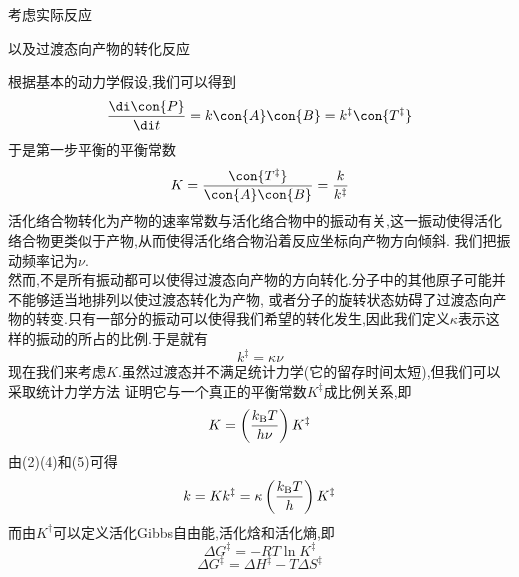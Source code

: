 \documentclass{ctexart}
\begin{document}
\begin{derivation}\setcounter{equation}{0}
    考虑实际反应
    \begin{tightcenter}
    \end{tightcenter}
    以及过渡态向产物的转化反应
    \begin{tightcenter}
    \end{tightcenter}
    根据基本的动力学假设,我们可以得到
    \begin{equation}
        \dfrac{\di\con{P}}{\di t}=k\con{A}\con{B}=k^\ddagger\con{T^\ddagger}
    \end{equation}
    于是第一步平衡的平衡常数
    \begin{equation}
        K=\dfrac{\con{T^\ddagger}}{\con{A}\con{B}}=\dfrac{k}{k^\ddagger}
    \end{equation}
    活化络合物转化为产物的速率常数与活化络合物中的振动有关,这一振动使得活化络合物更类似于产物,从而使得活化络合物沿着反应坐标向产物方向倾斜.%
    我们把振动频率记为$\nu$.\\
    然而,不是所有振动都可以使得过渡态向产物的方向转化.分子中的其他原子可能并不能够适当地排列以使过渡态转化为产物,%
    或者分子的旋转状态妨碍了过渡态向产物的转变.只有一部分的振动可以使得我们希望的转化发生,因此我们定义$\kappa$表示这样的振动的所占的比例.于是就有
    \begin{equation}
        k^\ddagger=\kappa\nu
    \end{equation}
    现在我们来考虑$K$.虽然过渡态并不满足统计力学(它的留存时间太短),但我们可以采取统计力学方法%
    证明它与一个真正的平衡常数$K^\ddagger$成比例关系,即
    \begin{equation}
        K=\left(\dfrac{k_{\text B}T}{h\nu}\right)K^\ddagger
    \end{equation}
    由(2)(4)和(5)可得
    \begin{equation}
        k=Kk^\ddagger=\kappa\left(\dfrac{k_{\text B}T}{h}\right)K^\ddagger
    \end{equation}
    而由$K^\dagger$可以定义活化Gibbs自由能,活化焓和活化熵,即
    \begin{equation}
        \Delta G^\ddagger=-RT\ln K^\ddagger
    \end{equation}
    \begin{equation}
        \Delta G^\ddagger=\Delta H^\ddagger-T\Delta S^\ddagger
    \end{equation}

\end{derivation}
\end{document}

